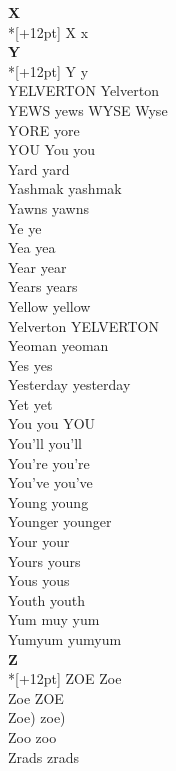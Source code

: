 \vspace{14pt}
\noindent\textbf{\Large X}\\*[+12pt]
X x\\

\vspace{14pt}
\noindent\textbf{\Large Y}\\*[+12pt]
Y y\\
YELVERTON Yelverton\\
YEWS yews WYSE Wyse\\
YORE yore\\
YOU You you\\
Yard yard\\
Yashmak yashmak\\
Yawns yawns\\
Ye ye\\
Yea yea\\
Year year\\
Years years\\
Yellow yellow\\
Yelverton YELVERTON\\
Yeoman yeoman\\
Yes yes\\
Yesterday yesterday\\
Yet yet\\
You you YOU\\
You'll you'll\\
You're you're\\
You've you've\\
Young young\\
Younger younger\\
Your your\\
Yours yours\\
Yous yous\\
Youth youth\\
Yum muy yum\\
Yumyum yumyum\\

\vspace{14pt}
\noindent\textbf{\Large Z}\\*[+12pt]
ZOE Zoe\\
Zoe ZOE\\
Zoe) zoe)\\
Zoo zoo\\
Zrads zrads\\

